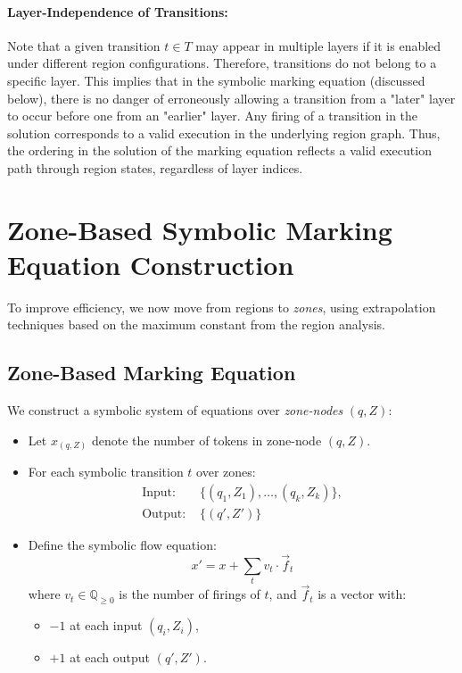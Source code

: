 \documentclass{article}
\begin{document}
\paragraph{Layer-Independence of Transitions:}
Note that a given transition $t \in T$ may appear in multiple layers if it is enabled under different region configurations. Therefore, transitions do not belong to a specific layer. This implies that in the symbolic marking equation (discussed below), there is no danger of erroneously allowing a transition from a "later" layer to occur before one from an "earlier" layer. Any firing of a transition in the solution corresponds to a valid execution in the underlying region graph. Thus, the ordering in the solution of the marking equation reflects a valid execution path through region states, regardless of layer indices.

\section{Zone-Based Symbolic Marking Equation Construction}

To improve efficiency, we now move from regions to \emph{zones}, using extrapolation techniques based on the maximum constant from the region analysis.

\subsection*{Zone-Based Marking Equation}
We construct a symbolic system of equations over \emph{zone-nodes} $(q, Z)$:
\begin{itemize}[noitemsep]
  \item Let $x_{(q,Z)}$ denote the number of tokens in zone-node $(q,Z)$.
  \item For each symbolic transition $t$ over zones:
    \begin{align*}
      \text{Input: } & \{(q_1, Z_1), \dots, (q_k, Z_k)\}, \\
      \text{Output: } & \{(q', Z')\}
    \end{align*}
  \item Define the symbolic flow equation:
    \[
      x' = x + \sum_{t} v_t \cdot \vec{f}_t
    \]
    where $v_t \in \mathbb{Q}_{\geq 0}$ is the number of firings of $t$, and $\vec{f}_t$ is a vector with:
    \begin{itemize}[noitemsep]
      \item $-1$ at each input $(q_i,Z_i)$,
      \item $+1$ at each output $(q',Z')$.
    \end{itemize}
\end{itemize}
\end{document}
